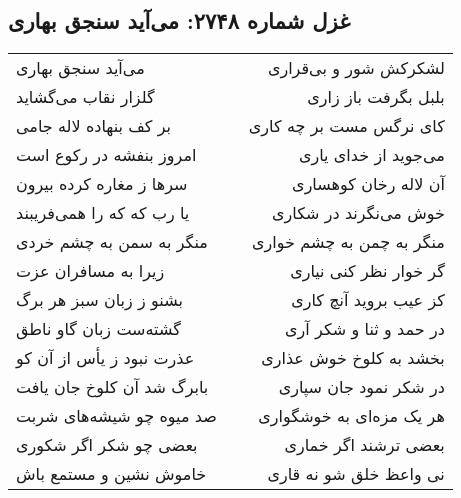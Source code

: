 \begin{center}
\section*{غزل شماره ۲۷۴۸: می‌آید سنجق بهاری}
\label{sec:2748}
\begin{longtable}{l p{0.5cm} r}
می‌آید سنجق بهاری
&&
لشکرکش شور و بی‌قراری
\\
گلزار نقاب می‌گشاید
&&
بلبل بگرفت باز زاری
\\
بر کف بنهاده لاله جامی
&&
کای نرگس مست بر چه کاری
\\
امروز بنفشه در رکوع است
&&
می‌جوید از خدای یاری
\\
سرها ز مغاره کرده بیرون
&&
آن لاله رخان کوهساری
\\
یا رب که که را همی‌فریبند
&&
خوش می‌نگرند در شکاری
\\
منگر به سمن به چشم خردی
&&
منگر به چمن به چشم خواری
\\
زیرا به مسافران عزت
&&
گر خوار نظر کنی نیاری
\\
بشنو ز زبان سبز هر برگ
&&
کز عیب بروید آنچ کاری
\\
گشته‌ست زبان گاو ناطق
&&
در حمد و ثنا و شکر آری
\\
عذرت نبود ز یأس از آن کو
&&
بخشد به کلوخ خوش عذاری
\\
بابرگ شد آن کلوخ جان یافت
&&
در شکر نمود جان سپاری
\\
صد میوه چو شیشه‌های شربت
&&
هر یک مزه‌ای به خوشگواری
\\
بعضی چو شکر اگر شکوری
&&
بعضی ترشند اگر خماری
\\
خاموش نشین و مستمع باش
&&
نی واعظ خلق شو نه قاری
\\
\end{longtable}
\end{center}
